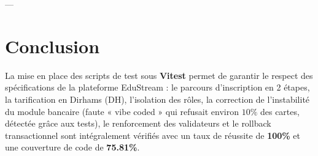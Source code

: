 \documentclass[12pt,a4paper]{article}
\begin{document}
---

\section{Conclusion}
La mise en place des scripts de test sous \textbf{Vitest} permet de garantir le respect des spécifications de la plateforme EduStream : le parcours d'inscription en 2 étapes, la tarification en Dirhams (DH), l'isolation des rôles, la correction de l'instabilité du module bancaire (faute « vibe coded » qui refusait environ $10\%$ des cartes, détectée grâce aux tests), le renforcement des validateurs et le rollback transactionnel sont intégralement vérifiés avec un taux de réussite de \textbf{100\%} et une couverture de code de \textbf{75.81\%}.
\end{document}
